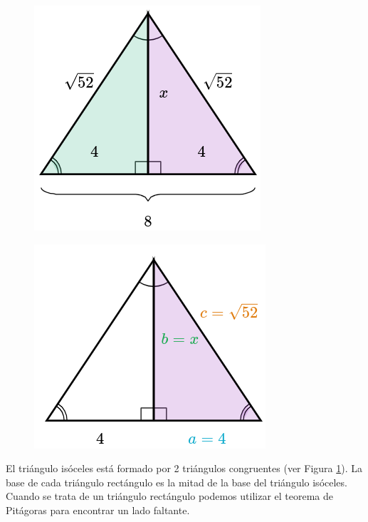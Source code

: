 \begin{solutionbox}{15cm}
    \begin{minipage}{0.3\textwidth}
        \begin{figure}[H]
            \centering
            \includegraphics[width=0.6\linewidth]{../images/pitagoras4a.png}
            \caption{}
            \label{fig:pitagoras4a}
        \end{figure}
        \begin{figure}[H]
            \centering
            \includegraphics[width=0.6\linewidth]{../images/pitagoras4b.png}
            \caption{}
            \label{fig:pitagoras4b}
        \end{figure}
    \end{minipage}\hfill
    \begin{minipage}{0.65\textwidth}
        El triángulo isóceles está formado por 2 triángulos congruentes (ver Figura \ref{fig:pitagoras4a}).
        La base de cada triángulo rectángulo es la mitad de la base del triángulo isóceles.
        Cuando se trata de un triángulo rectángulo podemos utilizar el teorema de Pitágoras para encontrar un lado faltante.

\end{minipage}
\end{solutionbox}
